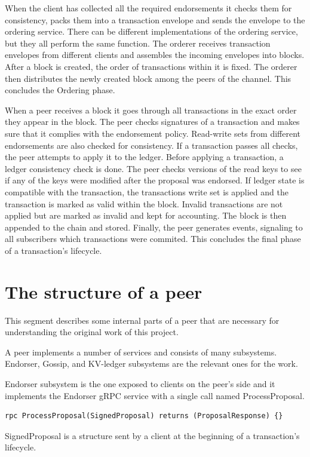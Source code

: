 When the client has collected all the required endorsements it checks them for consistency, packs them into a transaction envelope and sends the envelope to the ordering service. There can be different implementations of the ordering service, but they all perform the same function. The orderer receives transaction envelopes from different clients and assembles the incoming envelopes into blocks. After a block is created, the order of transactions within it is fixed. The orderer then distributes the newly created block among the peers of the channel. This concludes the Ordering phase.

When a peer receives a block it goes through all transactions in the exact order they appear in the block. The peer checks signatures of a transaction and makes sure that it complies with the endorsement policy. Read-write sets from different endorsements are also checked for consistency. If a transaction passes all checks, the peer attempts to apply it to the ledger. Before applying a transaction, a ledger consistency check is done. The peer checks versions of the read keys to see if any of the keys were modified after the proposal was endorsed. If ledger state is compatible with the transaction, the transactions write set is applied and the transaction is marked as valid within the block. Invalid transactions are not applied but are marked as invalid and kept for accounting. The block is then appended to the chain and stored. Finally, the peer generates events, signaling to all subscribers which transactions were commited. This concludes the final phase of a transaction's lifecycle.

\section{The structure of a peer}
\label{sec:back-peer}
This segment describes some internal parts of a peer that are necessary for understanding the original work of this project.

A peer implements a number of services and consists of many subsystems. Endorser, Gossip, and KV-ledger subsystems are the relevant ones for the work.

Endorser subsystem is the one exposed to clients on the peer's side and it implements the Endorser gRPC service with a single call named ProcessProposal.
\begin{lstlisting}
rpc ProcessProposal(SignedProposal) returns (ProposalResponse) {}
\end{lstlisting}
SignedProposal is a structure sent by a client at the beginning of a transaction's lifecycle.

